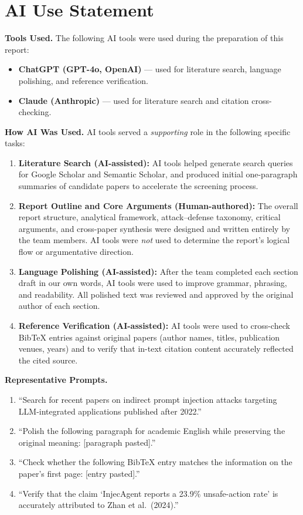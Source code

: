 \section*{AI Use Statement}

\textbf{Tools Used.}
The following AI tools were used during the preparation of this report:
\begin{itemize}
  \item \textbf{ChatGPT (GPT-4o, OpenAI)} --- used for literature search, language polishing, and reference verification.
  \item \textbf{Claude (Anthropic)} --- used for literature search and citation cross-checking.
\end{itemize}

\textbf{How AI Was Used.}
AI tools served a \emph{supporting} role in the following specific tasks:

\begin{enumerate}
  \item \textbf{Literature Search (AI-assisted):} AI tools helped generate search queries for Google Scholar and Semantic Scholar, and produced initial one-paragraph summaries of candidate papers to accelerate the screening process.
  \item \textbf{Report Outline and Core Arguments (Human-authored):} The overall report structure, analytical framework, attack--defense taxonomy, critical arguments, and cross-paper synthesis were designed and written entirely by the team members. AI tools were \emph{not} used to determine the report's logical flow or argumentative direction.
  \item \textbf{Language Polishing (AI-assisted):} After the team completed each section draft in our own words, AI tools were used to improve grammar, phrasing, and readability. All polished text was reviewed and approved by the original author of each section.
  \item \textbf{Reference Verification (AI-assisted):} AI tools were used to cross-check BibTeX entries against original papers (author names, titles, publication venues, years) and to verify that in-text citation content accurately reflected the cited source.
\end{enumerate}

\textbf{Representative Prompts.}
\begin{enumerate}
  \item ``Search for recent papers on indirect prompt injection attacks targeting LLM-integrated applications published after 2022.''
  \item ``Polish the following paragraph for academic English while preserving the original meaning: [paragraph pasted].''
  \item ``Check whether the following BibTeX entry matches the information on the paper's first page: [entry pasted].''
  \item ``Verify that the claim `InjecAgent reports a 23.9\% unsafe-action rate' is accurately attributed to Zhan et al.\ (2024).''
\end{enumerate}

